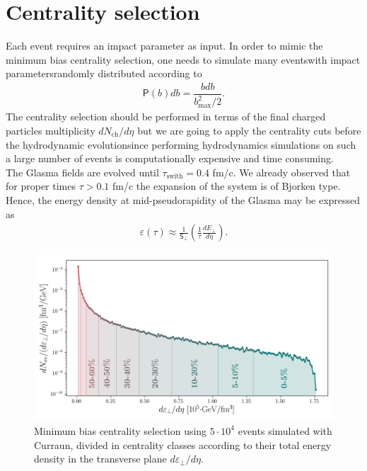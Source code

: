 \section{Centrality selection}
Each event requires an impact parameter as input. In order to mimic the minimum bias centrality selection, one needs to simulate many eventswith impact parametersrandomly distributed according to
\begin{align*}
    \textsf{P}(b)db=\dfrac{bdb}{b^2_\text{max}/2}.
\end{align*}
The centrality selection should be performed in terms of the final charged particles multiplicity $dN_\text{ch}/d\eta$ but we are going to apply the centrality cuts before the hydrodynamic evolutionsince performing hydrodynamics simulations on such a large number of events is computationally expensive and time consuming. \\
The Glasma fields are evolved until $\tau_\text{swith}=0.4$ fm/c. We already observed that for proper times $\tau>0.1$ fm/c the expansion of the system is of Bjorken type. Hence, the energy density at mid-pseudorapidity of the Glasma may be expressed as \cite{bjorken}
\begin{align*}
    \varepsilon(\tau)\approx \frac{1}{\textsf{S}_\perp}\left(\frac{1}{\tau}\frac{dE_\perp}{d\eta}\right).
\end{align*}

\vspace{-0.5cm}

\begin{figure}[h!]
	\includegraphics{images/centrality_cut.png}
	\caption{\normalsize Minimum bias centrality selection using $5\cdot 10^4$ events simulated with {\sffamily Curraun}, divided in centrality classes according to their total energy density in the transverse plane $d\varepsilon_\perp/d\eta$.}
\end{figure}

